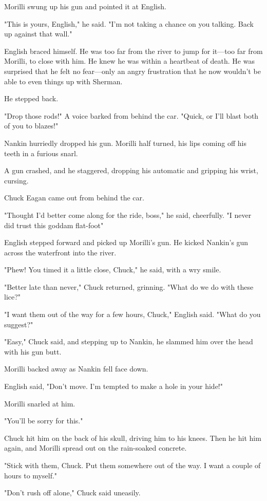 \documentclass{novel}
\begin{document}
Morilli swung up his gun and pointed it at English.

"This is yours, English," he said. "I'm not taking a chance on you talking. Back up against that wall."

English braced himself. He was too far from the river to jump for it—too far from Morilli, to close with him. He knew he was within a heartbeat of death. He was surprised that he felt no fear—only an angry frustration that he now wouldn't be able to even things up with Sherman.

He stepped back.

"Drop those rods!" A voice barked from behind the car. "Quick, or I'll blast both of you to blazes!"

Nankin hurriedly dropped his gun. Morilli half turned, his lips coming off his teeth in a furious snarl.

A gun crashed, and he staggered, dropping his automatic and gripping his wrist, cursing.

Chuck Eagan came out from behind the car.

"Thought I'd better come along for the ride, boss," he said, cheerfully. "I never did trust this goddam flat-foot"

English stepped forward and picked up Morilli's gun. He kicked Nankin's gun across the waterfront into the river.

"Phew! You timed it a little close, Chuck," he said, with a wry smile.

"Better late than never," Chuck returned, grinning. "What do we do with these lice?"

"I want them out of the way for a few hours, Chuck," English said. "What do you suggest?"

"Easy," Chuck said, and stepping up to Nankin, he slammed him over the head with his gun butt.

Morilli backed away as Nankin fell face down.

English said, "Don't move. I'm tempted to make a hole in your hide!"

Morilli snarled at him.

"You'll be sorry for this."

Chuck hit him on the back of his skull, driving him to his knees. Then he hit him again, and Morilli spread out on the rain-soaked concrete.

"Stick with them, Chuck. Put them somewhere out of the way. I want a couple of hours to myself."

"Don't rush off alone," Chuck said uneasily.
\end{document}
